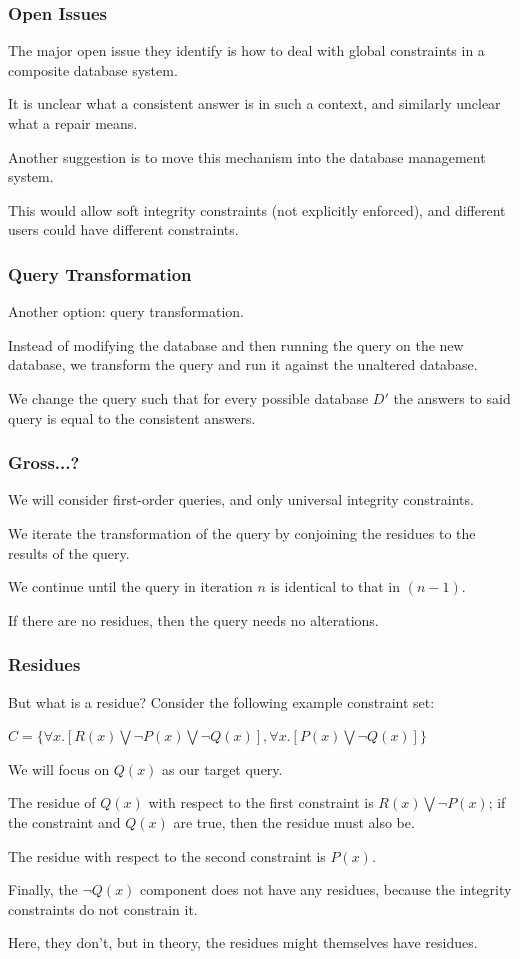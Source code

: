 \begin{frame}
\frametitle{Open Issues}

The major open issue they identify is how to deal with global constraints in a composite database system. 

It is unclear what a consistent answer is in such a context, and similarly unclear what a repair means.

Another suggestion is to move this mechanism into the database management system. 

This would allow soft integrity constraints (not explicitly enforced), and different users could have different constraints.

\end{frame}

\begin{frame}
\frametitle{Query Transformation}

Another option: query transformation. 

Instead of modifying the database and then running the query on the new database, we transform the query and run it against the unaltered database. 

We change the query such that for every possible database $D'$ the answers to said query is equal to the consistent answers.


\end{frame}

\begin{frame}
\frametitle{Gross...?}

We will consider first-order queries, and only universal integrity constraints. 

We iterate the transformation of the query by conjoining the \alert{residues} to the results of the query. 

We continue until the query in iteration $n$ is identical to that in $(n-1)$.

If there are no residues, then the query needs no alterations.


\end{frame}

\begin{frame}
\frametitle{Residues}

But what is a residue? Consider the following example constraint set:
\begin{center}
$C = \{\forall x.[R(x) \bigvee \neg P(x) \bigvee \neg Q(x)], \forall x.[P(x) \bigvee \neg Q(x)] \}$ 
\end{center}

We will focus on $Q(x)$ as our target query. 

The residue of $Q(x)$ with respect to the first constraint is $R(x) \bigvee \neg P(x)$; if the constraint and $Q(x)$ are true, then the residue must also be. 

The residue with respect to the second constraint is $P(x)$. 

Finally, the $\neg Q(x)$ component does not have any residues, because the integrity constraints do not constrain it. 

Here, they don't, but in theory, the residues might themselves have residues.

\end{frame}

